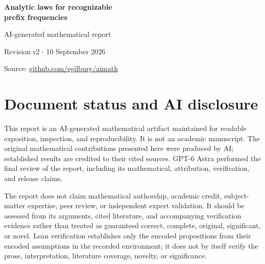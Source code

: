 \documentclass[11pt]{article}
\author{}
\date{}
\theoremstyle{definition}
\theoremstyle{remark}
\begin{document}
\begin{center}
{\LARGE\bfseries Analytic laws for recognizable\\[3pt] prefix frequencies\par}
\vspace{7pt}
{\large AI-generated mathematical report\par}
\vspace{7pt}
Revision r2 $\cdot$ 10 September 2026\par
\vspace{3pt}
Source: \href{https://github.com/egilburg/aimath}{github.com/egilburg/aimath}\par
\end{center}

\section{Document status and AI disclosure}
This report is an AI-generated mathematical artifact maintained for readable exposition, inspection, and reproducibility. It is not an academic manuscript. The original mathematical contributions presented here were produced by AI; established results are credited to their cited sources. GPT-6 Astra performed the final review of the report, including its mathematical, attribution, verification, and release claims.

The report does not claim mathematical authorship, academic credit, subject-matter expertise, peer review, or independent expert validation. It should be assessed from its arguments, cited literature, and accompanying verification evidence rather than treated as guaranteed correct, complete, original, significant, or novel. Lean verification establishes only the encoded propositions from their encoded assumptions in the recorded environment; it does not by itself verify the prose, interpretation, literature coverage, novelty, or significance.
\end{document}
